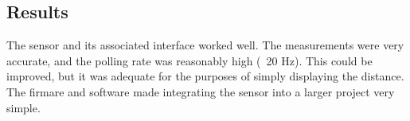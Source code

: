 \documentclass{article}
\begin{document}
	\subsection*{Results}
	
	The sensor and its associated interface worked well. The measurements were very accurate, and the polling rate was reasonably high (~20 Hz). This could be improved, but it was adequate for the purposes of simply displaying the distance. The firmare and software made integrating the sensor into a larger project very simple.
	
	
\end{document}

